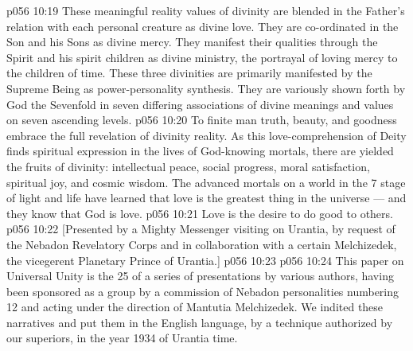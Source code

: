 \vs p056 10:19 These meaningful reality values of divinity are blended in the Father’s relation with each personal creature as divine love. They are co\hyp{}ordinated in the Son and his Sons as divine mercy. They manifest their qualities through the Spirit and his spirit children as divine ministry, the portrayal of loving mercy to the children of time. These three divinities are primarily manifested by the Supreme Being as power\hyp{}personality synthesis. They are variously shown forth by God the Sevenfold in seven differing associations of divine meanings and values on seven ascending levels.
\vs p056 10:20 \pc To finite man truth, beauty, and goodness embrace the full revelation of divinity reality. As this love\hyp{}comprehension of Deity finds spiritual expression in the lives of God\hyp{}knowing mortals, there are yielded the fruits of divinity: intellectual peace, social progress, moral satisfaction, spiritual joy, and cosmic wisdom. The advanced mortals on a world in the 7 stage of light and life have learned that love is the greatest thing in the universe --- and they know that God is love.
\vs p056 10:21 \pc Love is the desire to do good to others.
\vsetoff
\vs p056 10:22 [Presented by a Mighty Messenger visiting on Urantia, by request of the Nebadon Revelatory Corps and in collaboration with a certain Melchizedek, the vicegerent Planetary Prince of Urantia.]
\vs p056 10:23 \separatorline
\vs p056 10:24 This paper on Universal Unity is the 25 of a series of presentations by various authors, having been sponsored as a group by a commission of Nebadon personalities numbering 12 and acting under the direction of Mantutia Melchizedek. We indited these narratives and put them in the English language, by a technique authorized by our superiors, in the year 1934 of Urantia time.
\quizlink
